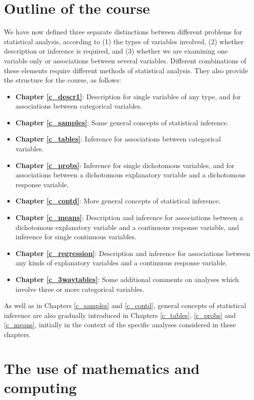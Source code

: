 \section{Outline of the course}
\label{s_intro_outline}

We have now defined three separate distinctions between different
problems for statistical analysis, according to (1) the types of
variables involved, (2) whether description or inference is required,
and (3) whether we are examining one variable only or associations
between several variables. Different combinations of these elements
require different methods of statistical analysis. They also provide the
structure for the course, as follows:
\begin{itemize}
\item
\textbf{Chapter \ref{c_descr1}}: Description for single variables of any
type, and for associations between categorical variables.
\item
\textbf{Chapter \ref{c_samples}}: Some general concepts
of statistical inference.
\item
\textbf{Chapter \ref{c_tables}}:
Inference for associations between categorical variables.
\item
\textbf{Chapter \ref{c_probs}}:
Inference for single dichotomous variables, and
for associations between a dichotomous explanatory
variable and a dichotomous response variable.
\item
\textbf{Chapter \ref{c_contd}}: More general concepts
of statistical inference.
\item
\textbf{Chapter \ref{c_means}}:
Description and inference for associations between a
dichotomous explanatory
variable and a continuous response variable, and
inference for single continuous variables.
\item
\textbf{Chapter \ref{c_regression}}:
Description and inference for associations between any kinds of
explanatory variables and a continuous response variable.
\item
\textbf{Chapter \ref{c_3waytables}}: Some additional comments on analyses which
involve three or more categorical variables.
\end{itemize}
As well as in Chapters \ref{c_samples} and \ref{c_contd}, general
concepts of statistical inference are also gradually introduced in
Chapters \ref{c_tables}, \ref{c_probs} and \ref{c_means}, initially in
the context of the specific analyses considered in these chapters.

\section{The use of mathematics and computing}
\label{s_intro_maths}


